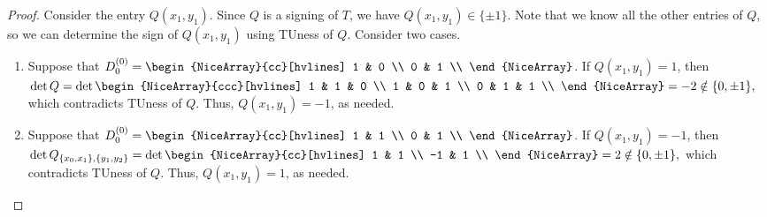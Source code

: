 \begin{proof}
    Consider the entry $Q (x_{1}, y_{1})$. Since $Q$ is a signing of $T$, we have $Q (x_{1}, y_{1}) \in \{\pm 1\}$. Note that we know all the other entries of $Q$, so we can determine the sign of $Q (x_{1}, y_{1})$ using TUness of $Q$. Consider two cases.
    \begin{enumerate}
        \item Suppose that $D_{0}^{(0)} = \begin{NiceArray}{cc}[hvlines] 1 & 0 \\ 0 & 1 \\ \end{NiceArray}$. If $Q (x_{1}, y_{1}) = 1$, then
        $
            \det Q = \det \begin{NiceArray}{ccc}[hvlines]
                1 & 1 & 0 \\
                1 & 0 & 1 \\
                0 & 1 & 1 \\
            \end{NiceArray} = -2 \notin \{0, \pm 1\},
        $
        which contradicts TUness of $Q$. Thus, $Q (x_{1}, y_{1}) = -1$, as needed.
        \item Suppose that $D_{0}^{(0)} = \begin{NiceArray}{cc}[hvlines] 1 & 1 \\ 0 & 1 \\ \end{NiceArray}$. If $Q (x_{1}, y_{1}) = -1$, then
        $
            \det Q_{\{x_{0}, x_{1}\}, \{y_{1}, y_{2}\}} = \det \begin{NiceArray}{cc}[hvlines]
                1 & 1 \\
                -1 & 1 \\
            \end{NiceArray} = 2 \notin \{0, \pm 1\},
        $
        which contradicts TUness of $Q$. Thus, $Q (x_{1}, y_{1}) = 1$, as needed.
    \end{enumerate}
\end{proof}


